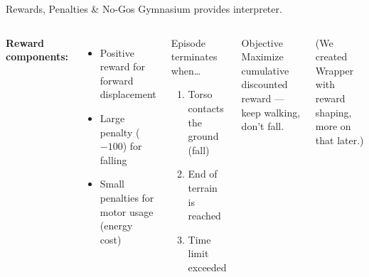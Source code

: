 \documentclass[aspectratio=169]{beamer}
\begin{document}
\begin{frame}{Rewards, Penalties \& No-Gos}
  Gymnasium provides interpreter. 
  \vspace{0.7em}
  \begin{columns}[c]
      \textbf{Reward components:}
      \begin{itemize}
        \item[\color{tuwblue}+] Positive reward for \alert{forward displacement}
        \item[\color{red}$-$] Large penalty ($-100$) for \alert{falling}
        \item[\color{orange}$-$] Small penalties for \alert{motor usage} (energy cost)
      \end{itemize}
      \begin{block}{Episode terminates when\ldots}
        \begin{enumerate}
          \item Torso contacts the ground (fall)
          \item End of terrain is reached
          \item Time limit exceeded
        \end{enumerate}
      \end{block}
      \vspace{0.5em}
      \begin{block}{Objective}
        Maximize cumulative discounted reward — keep walking, don't fall.
      \end{block}
      \vspace{1em}
      (We created Wrapper with reward shaping, more on that later.)
  \end{columns}
\end{frame}
\end{document}
